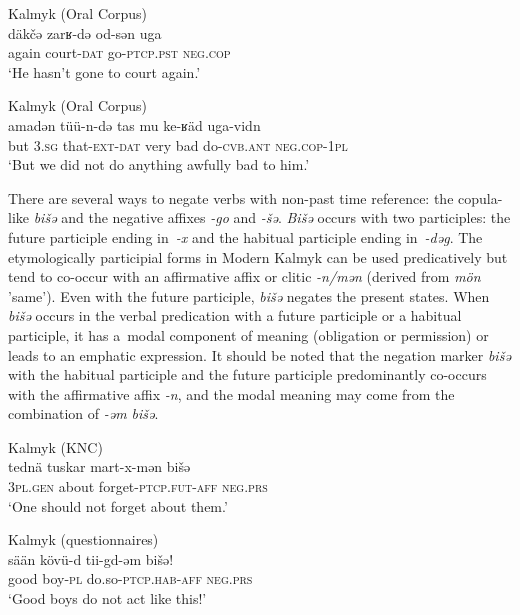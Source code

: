 \documentclass[output=paper,draft,draftmode,colorlinks,citecolor=brown]{langscibook}
\begin{document}
\ea Kalmyk (Oral Corpus) \label{ex:BK44}\\
	\gll däkčǝ zarʁ-dǝ od-sǝn uga\\
	again court-\textsc{dat} go-\textsc{ptcp.pst} \textsc{neg.cop}\\
	\glt `He hasn’t gone to court again.'
\z

\ea Kalmyk (Oral Corpus) \label{ex:BK45}\\
	\gll a\footnotemark madǝn tüü-n-dǝ tas mu ke-ʁäd uga-vidn\\
	but \textsc{3.sg} that-\textsc{ext-dat} very bad do-\textsc{cvb.ant} \textsc{neg.cop-1pl}\\
	\glt `But we did not do anything awfully bad to him.'
\z


There are several ways to negate verbs with non-past time reference: the copula-like \textit{bišǝ} and the negative affixes \textit{-go} and \textit{-šǝ}. \textit{Bišǝ} occurs with two participles: the future participle ending in \textit{-x} and the habitual participle ending in \textit{-dəg}. The etymologically participial forms in Modern Kalmyk can be used predicatively but tend to co-occur with an affirmative affix or clitic \textit{-n/mən} (derived from \textit{mön} 'same'). Even with the future participle, \textit{bišǝ} negates the present states. When \textit{bišǝ} occurs in the verbal predication with a future participle or a habitual participle, it has a modal component of meaning (obligation or permission) or leads to an emphatic expression. It should be noted that the negation marker \textit{bišǝ} with the habitual participle and the future participle predominantly co-occurs with the affirmative affix \textit{-n}, and the modal meaning may come from the combination of \textit{-ǝm bišǝ}.

\ea Kalmyk (KNC) \label{ex:BK46}\\
	\gll tednä		tuskar	mart-x-mǝn			bišǝ\\
	\textsc{3pl.gen}	about		forget-\textsc{ptcp.fut-aff}	\textsc{neg.prs}\\
	\glt `One should not forget about them.'
\z

\ea Kalmyk (questionnaires) \label{ex:BK47}\\
	\gll sään	kövü-d	tii-gd-ǝm				bišǝ!\\
	good	boy-\textsc{pl}	do.so-\textsc{ptcp.hab-aff}	\textsc{neg.prs}\\
	\glt `Good boys do not act like this!'
\z
\end{document}
